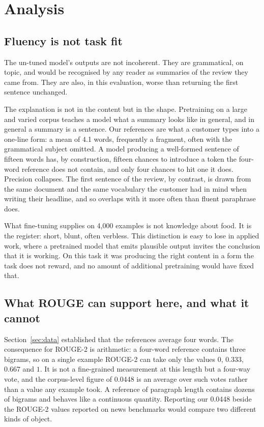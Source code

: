 \section{Analysis}
\label{sec:analysis}

\subsection{Fluency is not task fit}

The un-tuned model's outputs are not incoherent. They are grammatical, on
topic, and would be recognised by any reader as summaries of the review they
came from. They are also, in this evaluation, worse than returning the first
sentence unchanged.

The explanation is not in the content but in the shape. Pretraining on a large
and varied corpus teaches a model what a summary looks like in general, and in
general a summary is a sentence. Our references are what a customer types into
a one-line form: a mean of 4.1 words, frequently a fragment, often with the
grammatical subject omitted. A model producing a well-formed sentence of
fifteen words has, by construction, fifteen chances to introduce a token the
four-word reference does not contain, and only four chances to hit one it does.
Precision collapses. The first sentence of the review, by contrast, is drawn
from the same document and the same vocabulary the customer had in mind when
writing their headline, and so overlaps with it more often than fluent
paraphrase does.

What fine-tuning supplies on 4{,}000 examples is not knowledge about food. It
is the register: short, blunt, often verbless. This distinction is easy to lose
in applied work, where a pretrained model that emits plausible output invites
the conclusion that it is working. On this task it was producing the right
content in a form the task does not reward, and no amount of additional
pretraining would have fixed that.

\subsection{What ROUGE can support here, and what it cannot}
\label{sec:rouge-limits}

Section~\ref{sec:data} established that the references average four words. The
consequence for ROUGE-2 is arithmetic: a four-word reference contains three
bigrams, so on a single example ROUGE-2 can take only the values $0$, $0.333$,
$0.667$ and $1$. It is not a fine-grained measurement at this length but a
four-way vote, and the corpus-level figure of 0.0448 is an average over such
votes rather than a value any example took. A reference of paragraph length
contains dozens of bigrams and behaves like a continuous quantity. Reporting
our 0.0448 beside the ROUGE-2 values reported on news benchmarks would compare
two different kinds of object.

